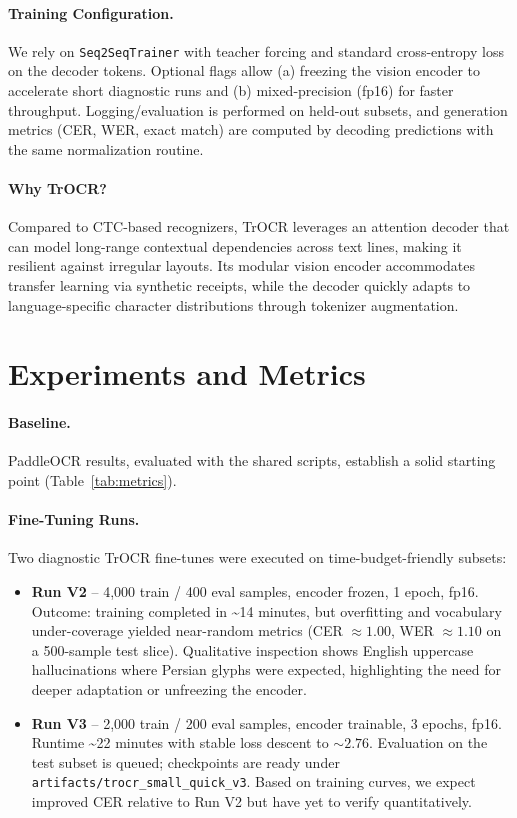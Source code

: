 \documentclass[11pt,a4paper]{article}
\begin{document}
\paragraph{Training Configuration.} We rely on \texttt{Seq2SeqTrainer} with teacher forcing and standard cross-entropy loss on the decoder tokens. Optional flags allow (a) freezing the vision encoder to accelerate short diagnostic runs and (b) mixed-precision (fp16) for faster throughput. Logging/evaluation is performed on held-out subsets, and generation metrics (CER, WER, exact match) are computed by decoding predictions with the same normalization routine.

\paragraph{Why TrOCR?} Compared to CTC-based recognizers, TrOCR leverages an attention decoder that can model long-range contextual dependencies across text lines, making it resilient against irregular layouts. Its modular vision encoder accommodates transfer learning via synthetic receipts, while the decoder quickly adapts to language-specific character distributions through tokenizer augmentation.

\section{Experiments and Metrics}
\paragraph{Baseline.} PaddleOCR results, evaluated with the shared scripts, establish a solid starting point (Table~\ref{tab:metrics}).

\paragraph{Fine-Tuning Runs.} Two diagnostic TrOCR fine-tunes were executed on time-budget-friendly subsets:
\begin{itemize}[nosep]
  \item \textbf{Run V2} -- 4,000 train / 400 eval samples, encoder frozen, 1 epoch, fp16. Outcome: training completed in \textasciitilde 14 minutes, but overfitting and vocabulary under-coverage yielded near-random metrics (CER $\approx 1.00$, WER $\approx 1.10$ on a 500-sample test slice). Qualitative inspection shows English uppercase hallucinations where Persian glyphs were expected, highlighting the need for deeper adaptation or unfreezing the encoder.
  \item \textbf{Run V3} -- 2,000 train / 200 eval samples, encoder trainable, 3 epochs, fp16. Runtime \textasciitilde 22 minutes with stable loss descent to $\sim 2.76$. Evaluation on the test subset is queued; checkpoints are ready under \texttt{artifacts/trocr\_small\_quick\_v3}. Based on training curves, we expect improved CER relative to Run V2 but have yet to verify quantitatively.
\end{itemize}
\end{document}
